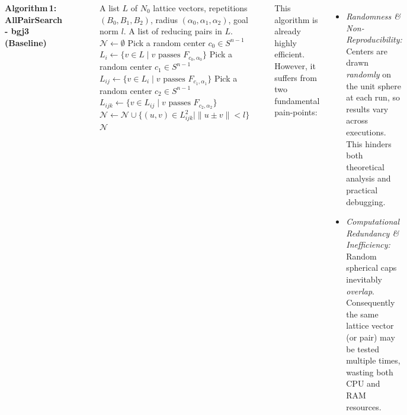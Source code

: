 \documentclass[25pt,
               a0paper,
               portrait]{tikzposter}
\begin{document}
\begin{columns}
{  %
  \noindent\textbf{Algorithm\,1: AllPairSearch - bgj3 (Baseline)}\\[-2ex]
  \noindent\rule{0.9\linewidth}{0.8pt}\\[-3ex]
  \begin{algorithmic}[1]
    \setlength{\topsep}{0pt}%
    \setlength{\partopsep}{0pt}%
    \setlength{\itemsep}{.3ex}%
    \setlength{\parskip}{0pt}%
    \Require A list $L$ of $N_0$ lattice vectors, repetitions $(B_0,B_1,B_2)$, radius $(\alpha_0,\alpha_1,\alpha_2)$, goal norm $l$.
    \Ensure A list of reducing pairs in $L$.
    \State $\mathcal{N}\gets\emptyset$
      \State Pick a random center $c_0\in S^{n-1}$
      \State $L_i\gets\{v\in L\mid v\text{ passes }F_{c_0,\alpha_0}\}$
        \State Pick a random center $c_1\in S^{n-1}$
        \State $L_{ij}\gets\{v\in L_i\mid v\text{ passes }F_{c_1,\alpha_1}\}$
          \State Pick a random center $c_2\in S^{n-1}$
          \State $L_{ijk}\gets\{v\in L_{ij}\mid v\text{ passes }F_{c_2,\alpha_2}\}$
          \State $\mathcal{N}\gets\mathcal{N}\cup\{(u,v)\in L_{ijk}^2\mid\|u\pm v\|<l\}$
        \EndFor
      \EndFor
    \EndFor
    \State \Return $\mathcal{N}$
  \end{algorithmic}
  \noindent\rule{0.9\linewidth}{0.8pt}

  This algorithm is already highly efficient. However, it suffers from two fundamental pain-points:
    \begin{itemize}
      \item \emph{Randomness \& Non-Reproducibility:}
        Centers are drawn \emph{randomly} on the unit sphere at each run,
        so results vary across executions.  This hinders both theoretical
        analysis and practical debugging.
      \item \emph{Computational Redundancy \& Inefficiency:}
        Random spherical caps inevitably \emph{overlap}.  Consequently
        the same lattice vector (or pair) may be tested multiple times,
        wasting both CPU and RAM resources.
    \end{itemize}
}


\end{columns}
\end{document}

